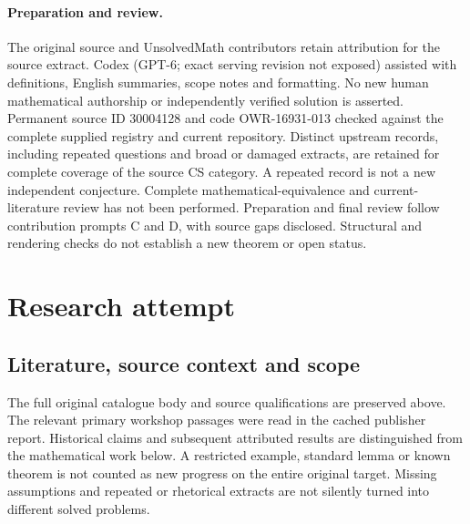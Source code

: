 \documentclass[11pt]{article}
\begin{document}
\paragraph{Preparation and review.}
The original source and UnsolvedMath contributors retain attribution for the source extract. Codex (GPT-6; exact serving revision not exposed) assisted with definitions, English summaries, scope notes and formatting. No new human mathematical authorship or independently verified solution is asserted. Permanent source ID 30004128 and code OWR-16931-013 checked against the complete supplied registry and current repository. Distinct upstream records, including repeated questions and broad or damaged extracts, are retained for complete coverage of the source CS category. A repeated record is not a new independent conjecture. Complete mathematical-equivalence and current-literature review has not been performed. Preparation and final review follow contribution prompts C and D, with source gaps disclosed. Structural and rendering checks do not establish a new theorem or open status.
\label{end:30004128}

\section{Research attempt}
\subsection{Literature, source context and scope}
The full original catalogue body and source qualifications are preserved above. The relevant primary workshop passages were read in the cached publisher report. Historical claims and subsequent attributed results are distinguished from the mathematical work below. A restricted example, standard lemma or known theorem is not counted as new progress on the entire original target. Missing assumptions and repeated or rhetorical extracts are not silently turned into different solved problems.
\end{document}
